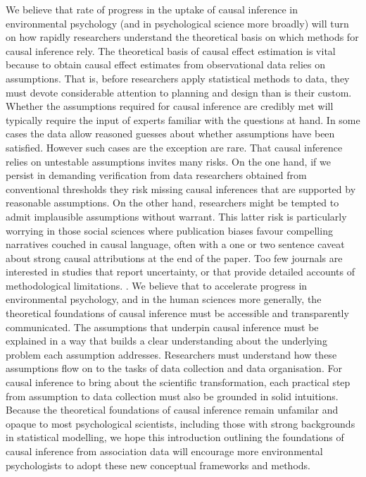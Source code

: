 \documentclass[
  singlecolumn]{article}
\begin{document}
We believe that rate of progress in the uptake of causal inference in
environmental psychology (and in psychological science more broadly)
will turn on how rapidly researchers understand the theoretical basis on
which methods for causal inference rely. The theoretical basis of causal
effect estimation is vital because to obtain causal effect estimates
from observational data relies on assumptions. That is, before
researchers apply statistical methods to data, they must devote
considerable attention to planning and design than is their custom.
Whether the assumptions required for causal inference are credibly met
will typically require the input of experts familiar with the questions
at hand. In some cases the data allow reasoned guesses about whether
assumptions have been satisfied. However such cases are the exception
are rare. That causal inference relies on untestable assumptions invites
many risks. On the one hand, if we persist in demanding verification
from data researchers obtained from conventional thresholds they risk
missing causal inferences that are supported by reasonable assumptions.
On the other hand, researchers might be tempted to admit implausible
assumptions without warrant. This latter risk is particularly worrying
in those social sciences where publication biases favour compelling
narratives couched in causal language, often with a one or two sentence
caveat about strong causal attributions at the end of the paper. Too few
journals are interested in studies that report uncertainty, or that
provide detailed accounts of methodological limitations. . We believe
that to accelerate progress in environmental psychology, and in the
human sciences more generally, the theoretical foundations of causal
inference must be accessible and transparently communicated. The
assumptions that underpin causal inference must be explained in a way
that builds a clear understanding about the underlying problem each
assumption addresses. Researchers must understand how these assumptions
flow on to the tasks of data collection and data organisation. For
causal inference to bring about the scientific transformation, each
practical step from assumption to data collection must also be grounded
in solid intuitions. Because the theoretical foundations of causal
inference remain unfamilar and opaque to most psychological scientists,
including those with strong backgrounds in statistical modelling, we
hope this introduction outlining the foundations of causal inference
from association data will encourage more environmental psychologists to
adopt these new conceptual frameworks and methods.
\end{document}

